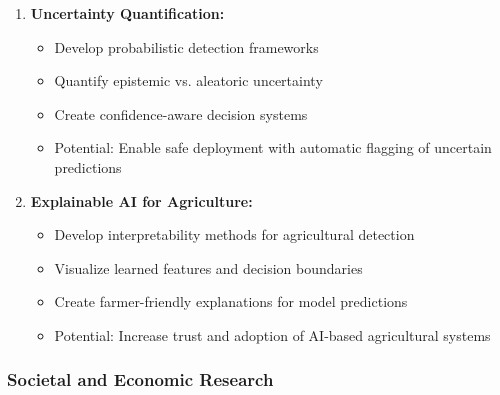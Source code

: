 \begin{enumerate}
    \item \textbf{Uncertainty Quantification:}
    \begin{itemize}
        \item Develop probabilistic detection frameworks
        \item Quantify epistemic vs. aleatoric uncertainty
        \item Create confidence-aware decision systems
        \item Potential: Enable safe deployment with automatic flagging of uncertain predictions
    \end{itemize}
    
    \item \textbf{Explainable AI for Agriculture:}
    \begin{itemize}
        \item Develop interpretability methods for agricultural detection
        \item Visualize learned features and decision boundaries
        \item Create farmer-friendly explanations for model predictions
        \item Potential: Increase trust and adoption of AI-based agricultural systems
    \end{itemize}
\end{enumerate}

\subsubsection{Societal and Economic Research}

